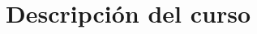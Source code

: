 \documentclass[a4paper,12pt]{/home/armando/Documentos/Cursos/LaTeX/Plantillas/lib/pub}
\begin{document}
\putLogo
\protecoTitle

\renewcommand{\contentsname}{Índice General}

\section{Descripción del curso}
\end{document}
